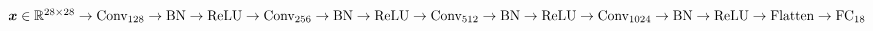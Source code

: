 $\vect{x} \in \real^{28 \times 28} \newline
	\rightarrow \text{Conv}_{128} \rightarrow \text{BN} \rightarrow \text{ReLU}  \newline
	\rightarrow \text{Conv}_{256} \rightarrow \text{BN} \rightarrow \text{ReLU} \newline
	\rightarrow \text{Conv}_{512} \rightarrow \text{BN} \rightarrow \text{ReLU} \newline
	\rightarrow \text{Conv}_{1024} \rightarrow \text{BN} \rightarrow \text{ReLU} \newline
	\rightarrow \text{Flatten} \rightarrow \text{FC}_{18}$
